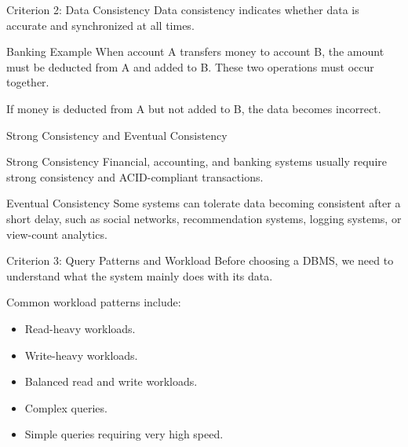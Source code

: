 \documentclass[aspectratio=169,11pt]{beamer}
\newcommand{\smallitem}{\setlength{\itemsep}{2pt}\setlength{\parskip}{0pt}}
\begin{document}
\begin{frame}{Criterion 2: Data Consistency}
Data consistency indicates whether data is accurate and synchronized at all times.

\begin{exampleblock}{Banking Example}
When account A transfers money to account B, the amount must be deducted from A and added to B. These two operations must occur together.
\end{exampleblock}

If money is deducted from A but not added to B, the data becomes incorrect.
\end{frame}

\begin{frame}{Strong Consistency and Eventual Consistency}
\begin{block}{Strong Consistency}
Financial, accounting, and banking systems usually require strong consistency and ACID-compliant transactions.
\end{block}

\begin{block}{Eventual Consistency}
Some systems can tolerate data becoming consistent after a short delay, such as social networks, recommendation systems, logging systems, or view-count analytics.
\end{block}
\end{frame}

\begin{frame}{Criterion 3: Query Patterns and Workload}
Before choosing a DBMS, we need to understand what the system mainly does with its data.

\vspace{2mm}
Common workload patterns include:
\begin{itemize}
  \smallitem
  \item Read-heavy workloads.
  \item Write-heavy workloads.
  \item Balanced read and write workloads.
  \item Complex queries.
  \item Simple queries requiring very high speed.
\end{itemize}
\end{frame}
\end{document}
